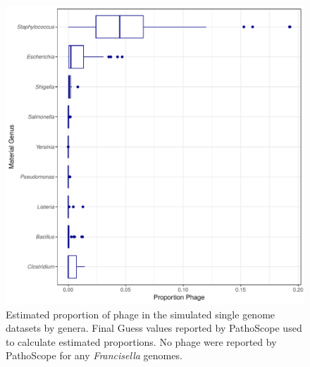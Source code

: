 \documentclass[fleqn,10pt,lineno]{wlpeerj}\usepackage[]{graphicx}\usepackage[]{color}
\makeatletter
\def\maxwidth{ %
  \ifdim\Gin@nat@width>\linewidth
    \linewidth
  \else
    \Gin@nat@width
  \fi
}
\newenvironment{knitrout}{}{} %
\makeatother
\begin{document}
\begin{knitrout}
\color{fgcolor}\begin{figure}
\includegraphics[width=\maxwidth]{figure/phage_prop-1} \caption[Estimated proportion of phage in the simulated single genome datasets by genera]{Estimated proportion of phage in the simulated single genome datasets by genera. Final Guess values reported by PathoScope used to calculate estimated proportions. No phage were reported by PathoScope for any \textit{Francisella} genomes.}\label{fig:phage_prop}
\end{figure}


\end{knitrout}
\end{document}
